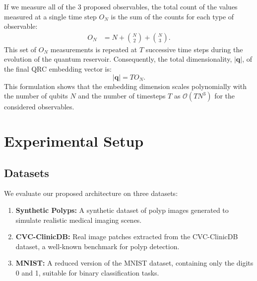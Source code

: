 \documentclass[conference]{IEEEtran}
\begin{document}
If we measure all of the $3$ proposed observables, the total count of the values measured at a single time step $O_N$ is the sum of the counts for each type of observable:
\begin{equation}
    \begin{aligned}
    O_N &= N + \binom{N}{2} + \binom{N}{3}.
    \end{aligned}
    \label{eq:embeddings_per_timestep}
\end{equation}
This set of $O_N$ measurements is repeated at $T$ successive time steps during the evolution of the quantum reservoir. Consequently, the total dimensionality, $\lvert \bm q \rvert$, of the final QRC embedding vector is:
\begin{equation}
    \lvert \bm q \rvert = T O_N.
    \label{eq:total_embedding_dimension}
\end{equation}
This formulation shows that the embedding dimension scales polynomially with the number of qubits $N$ and the number of timesteps $T$ as $\mathcal{O}(TN^3)$ for the considered observables.


\section{Experimental Setup}
\subsection{Datasets}
We evaluate our proposed architecture on three datasets:
\begin{enumerate}
    \item \textbf{Synthetic Polyps:} 
    A synthetic dataset of polyp images generated to simulate 
    realistic medical imaging scenes.
    
    \item \textbf{CVC-ClinicDB:} 
    Real image patches extracted from the CVC-ClinicDB 
    dataset, a well-known benchmark for polyp detection. 
    
    \item \textbf{MNIST:} 
    A reduced version of the MNIST dataset, 
    containing only the digits 0 and 1, suitable 
    for binary classification tasks.
\end{enumerate}
\end{document}

